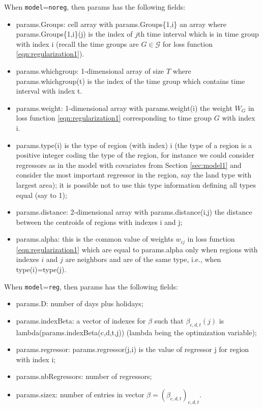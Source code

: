 \documentclass[article]{jss}
\begin{document}
{When {\tt{model}}={\tt{noreg}}, then params
has the following fields:
\begin{itemize}
\item params.Groups: cell array with params.Groups\{1,i\} an array
where params.Groups\{1,i\}(j) is the index of $j$th time interval which is
in time group with index i (recall the time groups are $G \in \mathcal{G}$ for loss function \eqref{eqn:regularization1}). 
\item params.whichgroup: 1-dimensional array of size $T$ where params.whichgroup(t) is the index
of the time group which contains time interval with index t.
\item params.weight: 1-dimensional array with 
params.weight(i) the weight $W_G$ in loss function \eqref{eqn:regularization1} corresponding to time group $G$ with index i.
\item params.type(i) is the type of region (with index)
i (the type of a region is a positive integer
coding the type of the region, for instance
we could consider regressors
as in the model with covariates
from Section \ref{sec:model1}
and consider the most important
regressor in the
region, say the land type with largest
area); it is possible not to use
this type information defining all types
equal (say to 1);
\item params.distance: 2-dimensional array with 
params.distance(i,j) the distance between the centroids
of regions with indexes i and j;
\item params.alpha: this is the common value of
weights $w_{i j}$ in loss function
\eqref{eqn:regularization1} which are equal to params.alpha only
when regions with indexes $i$ and $j$ are 
neighbors and are
of the same type, i.e., when
type(i)=type(j).
\end{itemize}
When {\tt{model}}={\tt{reg}}, then params
has the following fields:
\begin{itemize}
\item params.D: number of days plus holidays;
\item params.indexBeta: 
a vector of indexes for $\beta$ such that
$\beta_{c,d,t}(j)$ is 
lambda(params.indexBeta(c,d,t,j)) (lambda being the optimization variable);
\item params.regressor: params.regressor(j,i) is the value of  regressor
j for region with index i;
\item params.nbRegressors: number of regressors;
\item params.sizex: number of entries in vector $\beta=(\beta_{c,d,t})_{c,d,t}$.
\end{itemize}

}
\end{document}
